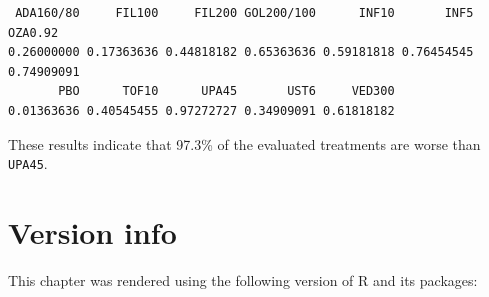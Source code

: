 \documentclass[
  letterpaper,
  DIV=11,
  numbers=noendperiod]{scrreprt}
\begin{document}
\begin{verbatim}
 ADA160/80     FIL100     FIL200 GOL200/100      INF10       INF5    OZA0.92 
0.26000000 0.17363636 0.44818182 0.65363636 0.59181818 0.76454545 0.74909091 
       PBO      TOF10      UPA45       UST6     VED300 
0.01363636 0.40545455 0.97272727 0.34909091 0.61818182 
\end{verbatim}

These results indicate that 97.3\% of the evaluated treatments are worse
than \texttt{UPA45}.

\hypertarget{version-info-4}{%
\section*{Version info}\label{version-info-4}}


This chapter was rendered using the following version of R and its
packages:
\end{document}
